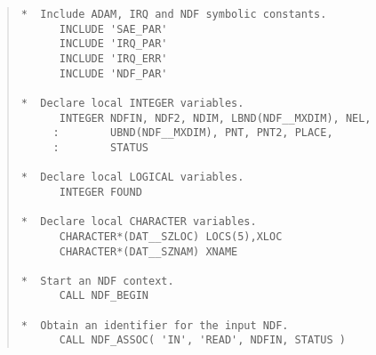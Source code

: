 \documentclass[twoside,11pt,nolof]{starlink}
\begin{document}
\begin{quote}
\begin{tabbing} %

\verb#*  Include ADAM, IRQ and NDF symbolic constants.       #\\
\verb#      INCLUDE 'SAE_PAR'                                #\\
\verb#      INCLUDE 'IRQ_PAR'                                #\\
\verb#      INCLUDE 'IRQ_ERR'                                #\\
\verb#      INCLUDE 'NDF_PAR'                                #\\
\verb#                                                       #\\
\verb#*  Declare local INTEGER variables.                    #\\
\verb#      INTEGER NDFIN, NDF2, NDIM, LBND(NDF__MXDIM), NEL,#\\
\verb#     :        UBND(NDF__MXDIM), PNT, PNT2, PLACE,      #\\
\verb#     :        STATUS                                   #\\
\verb#                                                       #\\
\verb#*  Declare local LOGICAL variables.                    #\\
\verb#      INTEGER FOUND                                    #\\
\verb#                                                       #\\
\verb#*  Declare local CHARACTER variables.                  #\\
\verb#      CHARACTER*(DAT__SZLOC) LOCS(5),XLOC              #\\
\verb#      CHARACTER*(DAT__SZNAM) XNAME                     #\\
\verb#                                                       #\\
\verb#*  Start an NDF context.                               #\\
\verb#      CALL NDF_BEGIN                                   #\\
\verb#                                                       #\\
\verb#*  Obtain an identifier for the input NDF.             #\\
\verb#      CALL NDF_ASSOC( 'IN', 'READ', NDFIN, STATUS )    #\\

\end{tabbing}
\end{quote}
\end{document}

